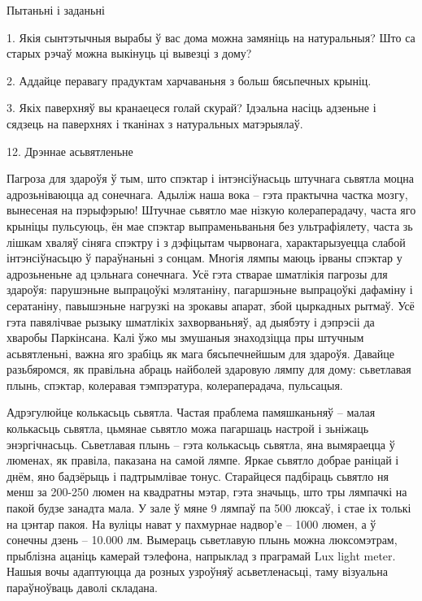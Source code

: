Пытаньні і заданьні

1. Якія сынтэтычныя вырабы ў вас дома можна замяніць на натуральныя? Што са старых рэчаў можна выкінуць ці вывезці з дому?

2. Аддайце перавагу прадуктам харчаваньня з больш бясьпечных крыніц.

3. Якіх паверхняў вы кранаецеся голай скурай? Ідэальна насіць адзеньне і сядзець на паверхнях і тканінах з натуральных матэрыялаў.


12. Дрэннае асьвятленьне

Пагроза для здароўя ў тым, што спэктар і інтэнсіўнасьць штучнага сьвятла моцна адрозьніваюцца ад сонечнага. Адыліж наша вока – гэта практычна частка мозгу, вынесеная на пэрыфэрыю! Штучнае сьвятло мае нізкую колераперадачу, часта яго крыніцы пульсуюць, ён мае спэктар выпраменьваньня без ультрафіялету, часта зь лішкам хваляў сіняга спэктру і з дэфіцытам чырвонага, характарызуецца слабой інтэнсіўнасьцю ў параўнаньні з сонцам. Многія лямпы маюць ірваны спэктар у адрозьненьне ад цэльнага сонечнага. Усё гэта стварае шматлікія пагрозы для здароўя: парушэньне выпрацоўкі мэлятаніну, пагаршэньне выпрацоўкі дафаміну і сератаніну, павышэньне нагрузкі на зрокавы апарат, збой цыркадных рытмаў. Усё гэта павялічвае рызыку шматлікіх захворваньняў, ад дыябэту і дэпрэсіі да хваробы Паркінсана. Калі ўжо мы змушаныя знаходзіцца пры штучным асьвятленьні, важна яго зрабіць як мага бясьпечнейшым для здароўя. Давайце разьбяромся, як правільна абраць найболей здаровую лямпу для дому: сьветлавая плынь, спэктар, колеравая тэмпэратура, колераперадача, пульсацыя.

Адрэгулюйце колькасьць сьвятла. Частая праблема памяшканьняў – малая колькасьць сьвятла, цьмянае сьвятло можа пагаршаць настрой і зьніжаць энэргічнасьць. Сьветлавая плынь – гэта колькасьць сьвятла, яна вымяраецца ў люменах, як правіла, паказана на самой лямпе. Яркае сьвятло добрае раніцай і днём, яно бадзёрыць і падтрымлівае тонус. Старайцеся падбіраць сьвятло ня менш за 200-250 люмен на квадратны мэтар, гэта значыць, што тры лямпачкі на пакой будзе занадта мала. У зале ў мяне 9 лямпаў па 500 люксаў, і стае іх толькі на цэнтар пакоя. На вуліцы нават у пахмурнае надвор'е – 1000 люмен, а ў сонечны дзень – 10.000 лм. Вымераць сьветлавую плынь можна люксомэтрам, прыблізна ацаніць камерай тэлефона, напрыклад з праграмай Lux light meter. Нашыя вочы адаптуюцца да розных узроўняў асьветленасьці, таму візуальна параўноўваць даволі складана.

